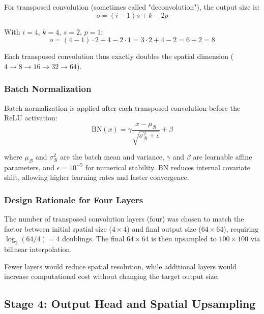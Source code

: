 \documentclass[12pt,a4paper,oneside]{report}
\begin{document}
For transposed convolution (sometimes called "deconvolution"), the output size is:
\begin{equation}
o = (i - 1)s + k - 2p
\end{equation}

With $i=4$, $k=4$, $s=2$, $p=1$:
\begin{equation}
o = (4 - 1)\cdot 2 + 4 - 2\cdot 1 = 3\cdot 2 + 4 - 2 = 6 + 2 = 8
\end{equation}

Each transposed convolution thus exactly doubles the spatial dimension ($4 \rightarrow 8 \rightarrow 16 \rightarrow 32 \rightarrow 64$).

\subsubsection{Batch Normalization}
\label{subsubsec:batch_normalization}

Batch normalization is applied after each transposed convolution before the ReLU activation:
\begin{equation}
\text{BN}(x) = \gamma \frac{x - \mu_{\mathcal{B}}}{\sqrt{\sigma_{\mathcal{B}}^2 + \epsilon}} + \beta
\end{equation}

where $\mu_{\mathcal{B}}$ and $\sigma_{\mathcal{B}}^2$ are the batch mean and variance, $\gamma$ and $\beta$ are learnable affine parameters, and $\epsilon = 10^{-5}$ for numerical stability. BN reduces internal covariate shift, allowing higher learning rates and faster convergence.

\subsubsection{Design Rationale for Four Layers}
\label{subsubsec:design_rationale_for_four_layers}

The number of transposed convolution layers (four) was chosen to match the factor between initial spatial size ($4 \times 4$) and final output size ($64 \times 64$), requiring $\log_2(64/4) = 4$ doublings. The final $64 \times 64$ is then upsampled to $100 \times 100$ via bilinear interpolation.

Fewer layers would reduce spatial resolution, while additional layers would increase computational cost without changing the target output size.

\subsection{Stage 4: Output Head and Spatial Upsampling}
\label{subsec:stage_4_output_head_and_spatial_upsampling}
\end{document}
